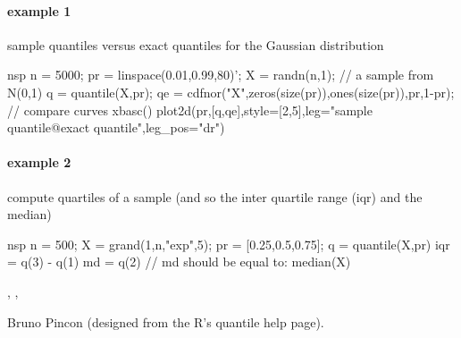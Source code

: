 \begin{examples}
\paragraph{example 1} sample quantiles versus exact quantiles for the Gaussian distribution
\begin{mintednsp}{nsp}
n = 5000;
pr = linspace(0.01,0.99,80)';
X = randn(n,1);  // a sample from N(0,1)
q = quantile(X,pr);
qe = cdfnor("X",zeros(size(pr)),ones(size(pr)),pr,1-pr);
// compare curves
xbasc()
plot2d(pr,[q,qe],style=[2,5],leg="sample quantile@exact quantile",leg_pos="dr")
\end{mintednsp}

\paragraph{example 2} compute quartiles of a sample (and so the inter quartile range (iqr) and the median)
\begin{mintednsp}{nsp}
n = 500;
X = grand(1,n,"exp",5);
pr = [0.25,0.5,0.75];
q = quantile(X,pr)
iqr = q(3) - q(1)
md = q(2)
// md should be equal to:
median(X)
\end{mintednsp}

\end{examples}

\begin{manseealso}
   , , 
\end{manseealso}

\begin{authors}
  Bruno Pincon (designed from the R's quantile help page).
\end{authors}
